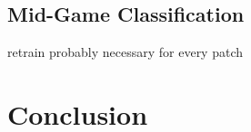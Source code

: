 \documentclass[12pt, a4paper, headinclude, twoside, plainheadsepline, open=right, numbers=noenddot, hidelinks, toc=listof, toc=bibliography]{scrreprt}
\begin{document}
\section{Mid-Game Classification}
\label{sec:midgame_class}

retrain probably necessary for every patch


\chapter{Conclusion}
\label{chap:conclusion}

%
%
%
\printbibliography

\appendix




\listoffigures																			%
\listoftables																			%
\cleardoublepage{}	%
\printacronyms[heading={chapter*}, name={List of Abbreviations}]
\end{document}
